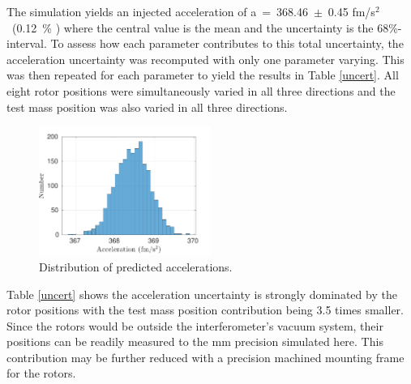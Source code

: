 \documentclass[superscriptaddress, twocolumn, prd]{revtex4-1}
\begin{document}
The simulation yields an injected acceleration of a~=~368.46~$\pm$~0.45 fm/s$^2$~(0.12~\% ) where the central value is the mean and the uncertainty is the 68\%-interval. To assess how each parameter contributes to this total uncertainty, the acceleration uncertainty was recomputed with only one parameter varying. This was then repeated for each parameter to yield the results in Table \ref{uncert}. All eight rotor positions were simultaneously varied  in all three directions and the test mass position was also varied in all three directions.

\begin{figure}[!h]
\centering \includegraphics[width=0.5\textwidth]{Super8_Dist.pdf}
\caption{Distribution of predicted accelerations.}
\label{dist} 
\end{figure}


Table \ref{uncert} shows the acceleration uncertainty is strongly dominated by the rotor positions with the test mass position contribution being 3.5 times smaller. Since the rotors would be outside the interferometer's vacuum system, their positions can be readily measured to the mm precision simulated here. This contribution may be further reduced with a precision machined mounting frame for the rotors. 
\end{document}
